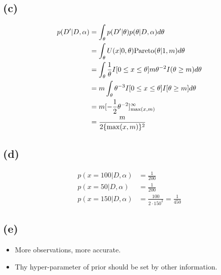 \documentclass{jsarticle}
\begin{document}
\subsection*{(c)}
\begin{align}
p(D'|D,\alpha) & = \int_{\theta}p(D'|\theta)p(\theta|D,\alpha)d\theta\\
& = \int_{\theta}U(x|0,\theta){\rm Pareto}(\theta|1,m)d\theta\\
& = \int_{\theta}\frac{1}{\theta}I[0\leq x \leq \theta]m\theta^{-2}I(\theta \geq m)d\theta \\
& = m \int_{\theta}\theta^{-3}I[0\leq x \leq \theta]I[\theta \geq m]d\theta \\
& = m[-\frac{1}{2}\theta^{-2}]_{\max(x,m)}^{\infty}\\
& = \frac{m}{2\{\max(x,m) \}^2}
\end{align}
\subsection*{(d)}
\begin{align}
p(x=100|D,\alpha) & = \frac{1}{200}\\
p(x=50|D,\alpha) & = \frac{1}{200} \\
p(x=150|D,\alpha) & = \frac{100}{2 \cdot 150^2} = \frac{1}{450}
\end{align}
\subsection*{(e)}
\begin{itemize}
	\item More observations, more accurate.
	\item Thy hyper-parameter of prior should be set by other information.
\end{itemize}
\end{document}
